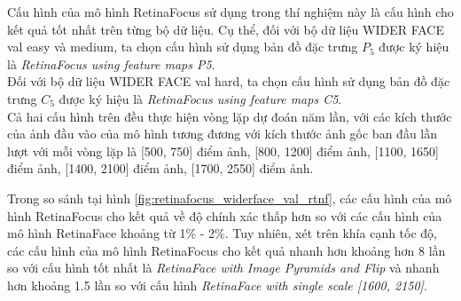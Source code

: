 {    \noindent
    Cấu hình của mô hình RetinaFocus sử dụng trong thí nghiệm này là cấu hình cho kết quả tốt nhất trên từng bộ dữ liệu.
    Cụ thể, đối với bộ dữ liệu WIDER FACE val easy và medium, ta chọn cấu hình sử dụng bản đồ đặc trưng $P_5$ được ký hiệu là \textit{RetinaFocus using feature maps P5}. \\
    Đối với bộ dữ liệu WIDER FACE val hard, ta chọn cấu hình sử dụng bản đồ đặc trưng $C_5$ được ký hiệu là \textit{RetinaFocus using feature maps C5}. \\
    Cả hai cấu hình trên đều thực hiện vòng lặp dự đoán năm lần, với các kích thước của ảnh đầu vào của mô hình tương đương với kích thước ảnh gốc ban đầu lần lượt với mỗi vòng lặp là [500, 750] điểm ảnh, [800, 1200] điểm ảnh, [1100, 1650] điểm ảnh, [1400, 2100] điểm ảnh, [1700, 2550] điểm ảnh.

    \noindent
    Trong so sánh tại hình \ref{fig:retinafocus_widerface_val_rtnf}, các cấu hình của mô hình RetinaFocus cho kết quả về độ chính xác thấp hơn so với các cấu hình của mô hình RetinaFace khoảng từ 1\% - 2\%.
    Tuy nhiên, xét trên khía cạnh tốc độ, các cấu hình của mô hình RetinaFocus cho kết quả nhanh hơn khoảng hơn 8 lần so với cấu hình tốt nhất là \textit{RetinaFace with Image Pyramids and Flip} và nhanh hơn khoảng 1.5 lần so với cấu hình \textit{RetinaFace with single scale [1600, 2150]}.

}
